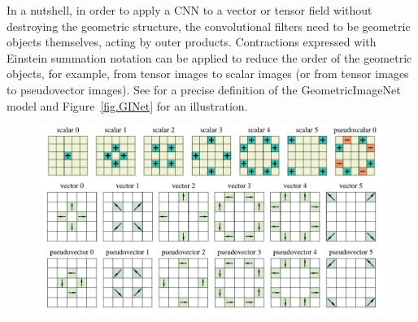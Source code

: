 \documentclass[10pt]{article}
\begin{document}
In a nutshell, in order to apply a CNN to a vector or tensor field without destroying the geometric structure, the convolutional filters need to be geometric objects themselves, acting by outer products.
Contractions expressed with Einstein summation notation can be applied to reduce the order of the geometric objects, for example, from tensor images to scalar images (or from tensor images to pseudovector images). See \cite{gregory2023geometricimagenet} for a precise definition of the GeometricImageNet model and Figure~\ref{fig.GINet} for an illustration. 
\begin{figure}[t!]\begin{mdframed}
    \centering
    \begin{minipage}{0.85\textwidth}
    \includegraphics[width=\textwidth]{filters_m5.pdf}
    \end{minipage}
    

\end{mdframed}
\end{figure}
\end{document}
